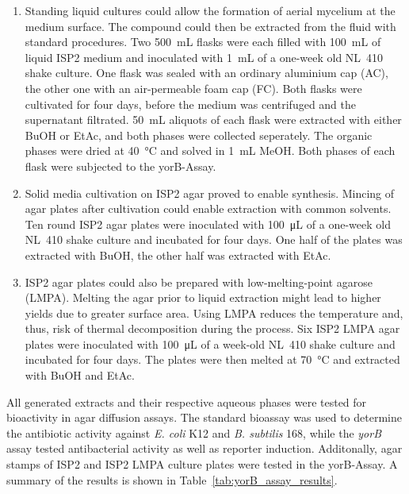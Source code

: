 \begin{enumerate}
    \item
	    Standing liquid cultures could allow the formation of aerial mycelium at the medium surface.
	    The compound could then be extracted from the fluid with standard procedures.
	    Two \SI{500}{\milli\liter} flasks were each filled with \SI{100}{\milli\liter} of liquid ISP2 medium and inoculated with \SI{1}{\milli\liter} of a one-week old NL~410 shake culture.
	    One flask was sealed with an ordinary aluminium cap (AC), the other one with an air-permeable foam cap (FC).
	    Both flasks were cultivated for four days, before the medium was centrifuged and the supernatant filtrated.
	    \SI{50}{\milli\liter} aliquots of each flask were extracted with either BuOH or EtAc, and both phases were collected seperately.
	    The organic phases were dried at \SI{40}{\celsius} and solved in \SI{1}{\milli\liter} MeOH.
	    Both phases of each flask were subjected to the yorB-Assay.
    \item
		Solid media cultivation on ISP2 agar proved to enable synthesis.
		Mincing of agar plates after cultivation could enable extraction with common solvents.
		Ten round ISP2 agar plates were inoculated with \SI{100}{\micro\liter} of a one-week old NL~410 shake culture and incubated for four days.
		One half of the plates was extracted with BuOH, the other half was extracted with EtAc.
    \item
        ISP2 agar plates could also be prepared with low-melting-point agarose (LMPA).
        Melting the agar prior to liquid extraction might lead to higher yields due to greater surface area.
        Using LMPA reduces the temperature and, thus, risk of thermal decomposition during the process.
        Six ISP2 LMPA agar plates were inoculated with \SI{100}{\micro\liter} of a week-old NL~410 shake culture and incubated for four days.
        The plates were then melted at \SI{70}{\celsius} and extracted with BuOH and EtAc.
\end{enumerate}

All generated extracts and their respective aqueous phases were tested for bioactivity in agar diffusion assays.
The standard bioassay was used to determine the antibiotic activity against \textit{E. coli} K12 and \textit{B. subtilis} 168, while the \emph{yorB} assay tested antibacterial activity as well as reporter induction.
Additonally, agar stamps of ISP2 and ISP2 LMPA culture plates were tested in the yorB-Assay.
A summary of the results is shown in Table~\ref{tab:yorB_assay_results}.

